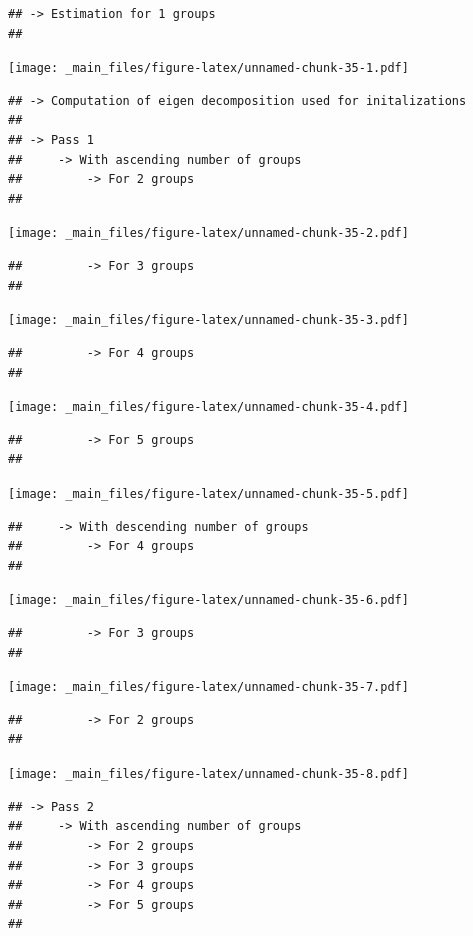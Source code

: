 \documentclass[
]{book}
\theoremstyle{definition}
\theoremstyle{definition}
\theoremstyle{definition}
\theoremstyle{definition}
\theoremstyle{remark}
\begin{document}
\begin{verbatim}
## -> Estimation for 1 groups
## 
\end{verbatim}

\texttt{[image: \_main\_files/figure-latex/unnamed-chunk-35-1.pdf]}

\begin{verbatim}
## -> Computation of eigen decomposition used for initalizations
## 
## -> Pass 1
##     -> With ascending number of groups
##         -> For 2 groups
## 
\end{verbatim}

\texttt{[image: \_main\_files/figure-latex/unnamed-chunk-35-2.pdf]}

\begin{verbatim}
##         -> For 3 groups
## 
\end{verbatim}

\texttt{[image: \_main\_files/figure-latex/unnamed-chunk-35-3.pdf]}

\begin{verbatim}
##         -> For 4 groups
## 
\end{verbatim}

\texttt{[image: \_main\_files/figure-latex/unnamed-chunk-35-4.pdf]}

\begin{verbatim}
##         -> For 5 groups
## 
\end{verbatim}

\texttt{[image: \_main\_files/figure-latex/unnamed-chunk-35-5.pdf]}

\begin{verbatim}
##     -> With descending number of groups
##         -> For 4 groups
## 
\end{verbatim}

\texttt{[image: \_main\_files/figure-latex/unnamed-chunk-35-6.pdf]}

\begin{verbatim}
##         -> For 3 groups
## 
\end{verbatim}

\texttt{[image: \_main\_files/figure-latex/unnamed-chunk-35-7.pdf]}

\begin{verbatim}
##         -> For 2 groups
## 
\end{verbatim}

\texttt{[image: \_main\_files/figure-latex/unnamed-chunk-35-8.pdf]}

\begin{verbatim}
## -> Pass 2
##     -> With ascending number of groups
##         -> For 2 groups
##         -> For 3 groups
##         -> For 4 groups
##         -> For 5 groups
## 
\end{verbatim}
\end{document}
